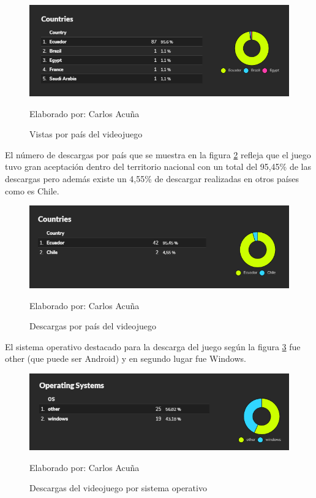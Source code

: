 \documentclass[a4paper, openright, 12pt]{report}
\begin{document}
\begin{figure}[h]
\captionsetup{justification=centering,margin=2cm}
\includegraphics[scale=1]{u09}
\centering
\caption{Vistas por país del videojuego}
Elaborado por: Carlos Acuña
\label{fig:u09}
\end{figure}

\justify
El número de descargas por país que se muestra en la figura \ref{fig:u10} refleja que el juego tuvo gran aceptación dentro del territorio nacional con un total del 95,45\% de las descargas pero además existe un 4,55\% de descargar realizadas en otros países como es Chile.
\clearpage
\begin{figure}[h]
\captionsetup{justification=centering,margin=2cm}
\includegraphics[scale=1]{u10}
\centering
\caption{Descargas por país del videojuego}
Elaborado por: Carlos Acuña
\label{fig:u10}
\end{figure}

\justify
El sistema operativo destacado para la descarga del juego según la figura \ref{fig:u11} fue other (que puede ser Android) y en segundo lugar fue Windows.

\begin{figure}[h]
\captionsetup{justification=centering,margin=2cm}
\includegraphics[scale=1]{u11}
\centering
\caption{Descargas del videojuego por sistema operativo}
Elaborado por: Carlos Acuña
\label{fig:u11}
\end{figure}
 
\end{document}
